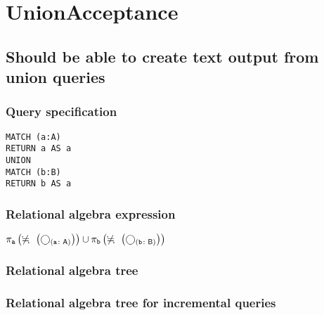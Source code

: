 \section{UnionAcceptance}

\subsection{Should be able to create text output from union queries}

\subsubsection*{Query specification}

\begin{lstlisting}
MATCH (a:A)
RETURN a AS a
UNION
MATCH (b:B)
RETURN b AS a
\end{lstlisting}

\subsubsection*{Relational algebra expression}

$\projection{\var{a}} \left(\alldifferent{} \left(\getvertices{a}{A}\right)\right) \union \projection{\var{b}} \left(\alldifferent{} \left(\getvertices{b}{B}\right)\right)$

\subsubsection*{Relational algebra tree}


\subsubsection*{Relational algebra tree for incremental queries}

